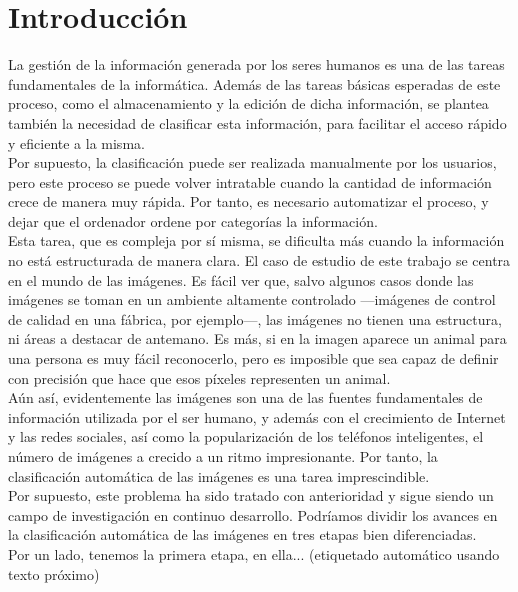 \section{Introducción}
La gestión de la información generada por los seres humanos es una de las tareas fundamentales de la informática. Además de las tareas básicas esperadas de este proceso, como el almacenamiento y la edición de dicha información, se plantea también la necesidad de clasificar esta información, para facilitar el acceso rápido y eficiente a la misma.\\

Por supuesto, la clasificación puede ser realizada manualmente por los usuarios, pero este proceso se puede volver intratable cuando la cantidad de información crece de manera muy rápida. Por tanto, es necesario automatizar el proceso, y dejar que el ordenador ordene por categorías la información.\\

Esta tarea, que es compleja por sí misma, se dificulta más cuando la información no está estructurada de manera clara. El caso de estudio de este trabajo se centra en el mundo de las imágenes. Es fácil ver que, salvo algunos casos donde las imágenes se toman en un ambiente altamente controlado ---imágenes de control de calidad en una fábrica, por ejemplo---, las imágenes no tienen una estructura, ni áreas a destacar de antemano. Es más, si en la imagen aparece un animal para una persona es muy fácil reconocerlo, pero es imposible que sea capaz de definir con precisión que hace que esos píxeles representen un animal.\\

Aún así, evidentemente las imágenes son una de las fuentes fundamentales de información utilizada por el ser humano, y además con el crecimiento de Internet y las redes sociales, así como la popularización de los teléfonos inteligentes, el número de imágenes a crecido a un ritmo impresionante. Por tanto, la clasificación automática de las imágenes es una tarea imprescindible.\\

Por supuesto, este problema ha sido tratado con anterioridad y sigue siendo un campo de investigación en continuo desarrollo. Podríamos dividir los avances en la clasificación automática de las imágenes en tres etapas bien diferenciadas.\\

Por un lado, tenemos la primera etapa, en ella... (etiquetado automático usando texto próximo)

